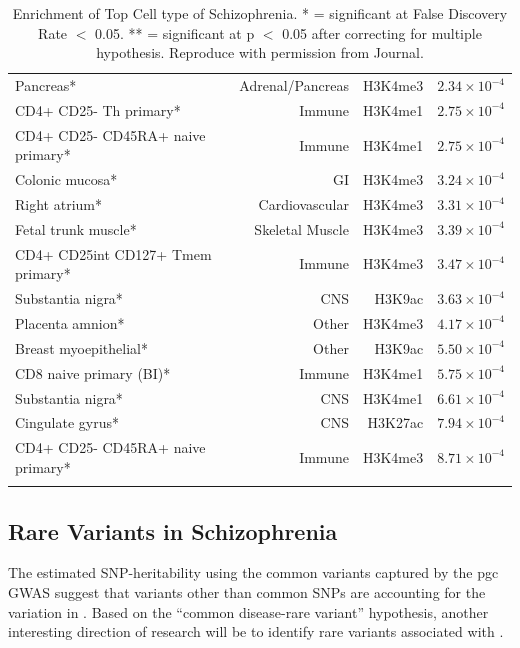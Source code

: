 \begin{singlespace}
\begin{longtable}{p{6cm}rrr}
			Pancreas* & Adrenal/Pancreas & H3K4me3 & $2.34\times 10^{-4}$ \\
			CD4+ CD25- Th primary* & Immune & H3K4me1 & $2.75\times 10^{-4}$ \\
			CD4+ CD25- CD45RA+ naive primary* & Immune & H3K4me1 & $2.75\times 10^{-4}$\\
			Colonic mucosa* & GI    & H3K4me3 & $3.24\times 10^{-4}$ \\
			Right atrium* & Cardiovascular & H3K4me3 & $3.31\times 10^{-4}$ \\
			Fetal trunk muscle* & Skeletal Muscle & H3K4me3 & $3.39\times 10^{-4}$ \\
			CD4+ CD25int CD127+ Tmem primary* & Immune & H3K4me3 & $3.47\times 10^{-4}$ \\
			Substantia nigra* & CNS   & H3K9ac & $3.63\times 10^{-4}$ \\
			Placenta amnion* & Other & H3K4me3 & $4.17\times 10^{-4}$ \\
			Breast myoepithelial* & Other & H3K9ac & $5.50\times 10^{-4}$ \\
			CD8 naive primary (BI)* & Immune & H3K4me1 & $5.75\times 10^{-4}$ \\
			Substantia nigra* & CNS   & H3K4me1 & $6.61\times 10^{-4}$ \\
			Cingulate gyrus* & CNS   & H3K27ac & $7.94\times 10^{-4}$ \\
			CD4+ CD25- CD45RA+ naive primary* & Immune & H3K4me3 & $8.71\times 10^{-4}$ \\
			\bottomrule
			\caption[Enrichment of Top Cell Type of Schizophrenia]{Enrichment of Top Cell type of Schizophrenia.
				* = significant at False Discovery Rate $<$ 0.05.
				** = significant at p $<$ 0.05 after correcting for multiple hypothesis. 
				Reproduce with permission from Journal.\citep{Finucane2015}}
			\label{tab:cellTypeScz}%
		\end{longtable}%
	\end{singlespace}
		
	\subsection{Rare Variants in Schizophrenia}
	The estimated \gls{SNP}-heritability using the common variants captured by the \gls{pgc}  \gls{GWAS} suggest that variants other than common \glspl{SNP} are accounting for the variation in .
	Based on the ``common disease-rare variant'' hypothesis, another interesting direction of  research will be to identify rare variants associated with .
	
